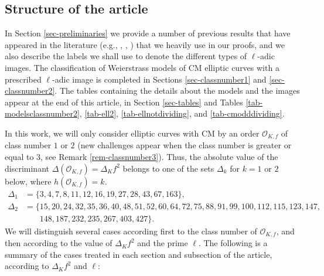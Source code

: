 \documentclass[11pt]{amsart}
\theoremstyle{definition}
\newcommand{\Of}{\mathcal{O}_{K,f}}
\begin{document}
\subsection{Structure of the article}\label{sec-structure} In Section \ref{sec-preliminaries} we provide a number of previous results that have appeared in the literature (e.g., \cite{lozano-galoiscm}, \cite{yelton}, \cite{zywina}) that we heavily use in our proofs, and we also describe the labels we shall use to denote the different types of $\ell$-adic images.  The classification of Weierstrass models of CM elliptic curves with a prescribed $\ell$-adic image is completed in Sections \ref{sec-classnumber1} and \ref{sec-classnumber2}. The tables containing the details about the models and the images appear at the end of this article, in Section \ref{sec-tables} and Tables \ref{tab-modelsclassnumber2}, \ref{tab-ell2}, \ref{tab-ellnotdividing}, and \ref{tab-cmodddividing}.

In this work, we will only consider elliptic curves with CM by an order $\Of$ of class number $1$ or $2$ (new challenges appear when the class number is greater or equal to $3$, see Remark \ref{rem-classnumber3}). Thus, the absolute value of the discriminant $\Delta(\Of)=\Delta_K f^2$ belongs to one of the sets $\Delta_k$ for $k=1$ or $2$ below, where $h(\Of)=k$.
\begin{align*} \Delta_1 &= \{ 3, 4, 7, 8, 11, 12, 16, 19, 27, 28, 43, 67, 163\},\\
\Delta_2 &= \{15, 20, 24, 32, 35, 36, 40, 48, 51, 52, 60, 64, 72, 75, 88, 91, 99, 100, 112, 115, 123, 147,\phantom{\}}\\
& \phantom{= \{} 148, 187, 232, 235, 267, 403, 427\}.
\end{align*}
We will distinguish several cases according first to the class number of $\Of$, and then according to the value of $\Delta_K f^2$ and the prime $\ell$. The following is a summary of the cases treated in each section and subsection of the article, according to $\Delta_K f^2$ and $\ell$:
\end{document}
